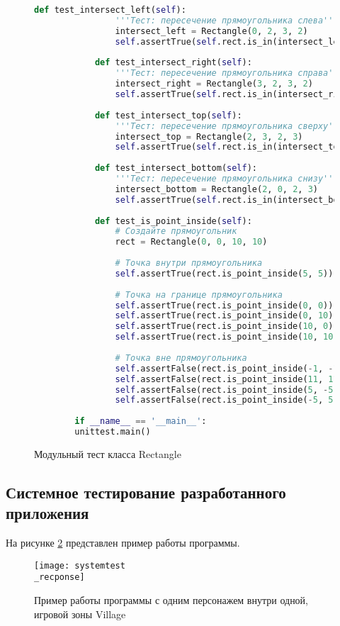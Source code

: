 \begin{figure}[H]
	\begin{lstlisting}[language=Python]
			def test_intersect_left(self):
				'''Тест: пересечение прямоугольника слева'''
				intersect_left = Rectangle(0, 2, 3, 2)
				self.assertTrue(self.rect.is_in(intersect_left))
			
			def test_intersect_right(self):
				'''Тест: пересечение прямоугольника справа'''
				intersect_right = Rectangle(3, 2, 3, 2)
				self.assertTrue(self.rect.is_in(intersect_right))
			
			def test_intersect_top(self):
				'''Тест: пересечение прямоугольника сверху'''
				intersect_top = Rectangle(2, 3, 2, 3)
				self.assertTrue(self.rect.is_in(intersect_top))
			
			def test_intersect_bottom(self):
				'''Тест: пересечение прямоугольника снизу'''
				intersect_bottom = Rectangle(2, 0, 2, 3)
				self.assertTrue(self.rect.is_in(intersect_bottom))
			
			def test_is_point_inside(self):
				# Создайте прямоугольник
				rect = Rectangle(0, 0, 10, 10)
				
				# Точка внутри прямоугольника
				self.assertTrue(rect.is_point_inside(5, 5))
				
				# Точка на границе прямоугольника
				self.assertTrue(rect.is_point_inside(0, 0))
				self.assertTrue(rect.is_point_inside(0, 10))
				self.assertTrue(rect.is_point_inside(10, 0))
				self.assertTrue(rect.is_point_inside(10, 10))
				
				# Точка вне прямоугольника
				self.assertFalse(rect.is_point_inside(-1, -1))
				self.assertFalse(rect.is_point_inside(11, 11))
				self.assertFalse(rect.is_point_inside(5, -5))
				self.assertFalse(rect.is_point_inside(-5, 5))
		
		if __name__ == '__main__':
		unittest.main()
	\end{lstlisting}  
	\caption{Модульный тест класса Rectangle}
	\label{unitRec2:image}
\end{figure}

\subsection{Системное тестирование разработанного приложения}

На рисунке \ref{systemtest_recponse:image} представлен пример работы программы.
\begin{figure}[H]
	\centering
	\texttt{[image: systemtest\\\_recponse]}
	\caption{Пример работы программы с одним персонажем внутри одной, игровой зоны Village}
	\label{systemtest_recponse:image}
\end{figure}

